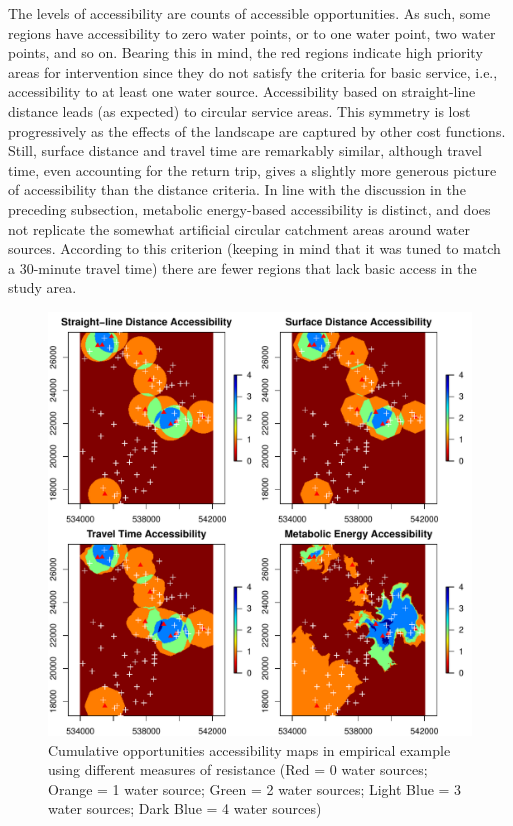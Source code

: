 \documentclass[]{elsarticle} %
\makeatletter
\def\maxwidth{\ifdim\Gin@nat@width>\linewidth\linewidth
\else\Gin@nat@width\fi}
\let\Oldincludegraphics\includegraphics
\renewcommand{\includegraphics}[1]{\Oldincludegraphics[width=\maxwidth]{#1}}
\makeatother
\begin{document}
The levels of accessibility are counts of accessible opportunities. As
such, some regions have accessibility to zero water points, or to one
water point, two water points, and so on. Bearing this in mind, the red
regions indicate high priority areas for intervention since they do not
satisfy the criteria for basic service, i.e., accessibility to at least
one water source. Accessibility based on straight-line distance leads
(as expected) to circular service areas. This symmetry is lost
progressively as the effects of the landscape are captured by other cost
functions. Still, surface distance and travel time are remarkably
similar, although travel time, even accounting for the return trip,
gives a slightly more generous picture of accessibility than the
distance criteria. In line with the discussion in the preceding
subsection, metabolic energy-based accessibility is distinct, and does
not replicate the somewhat artificial circular catchment areas around
water sources. According to this criterion (keeping in mind that it was
tuned to match a \(30\)-minute travel time) there are fewer regions that
lack basic access in the study area.

\begin{figure}
\centering
\includegraphics{Cost-Functions-for-Walking-Accessibility_files/figure-latex/figure-accessibility-cumulative-opportunities-kenya-1.pdf}
\caption{\label{fig:figure-accessibility-cumulative-opportunities-kenya}Cumulative
opportunities accessibility maps in empirical example using different
measures of resistance (Red = 0 water sources; Orange = 1 water source;
Green = 2 water sources; Light Blue = 3 water sources; Dark Blue = 4
water sources)}
\end{figure}
\end{document}
